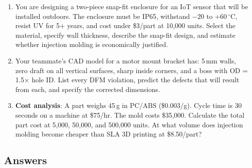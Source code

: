\documentclass[11pt,letterpaper,twoside,openany]{book}
\newcommand{\degC}{\ensuremath{{}^{\circ}\text{C}}}
\begin{document}
\begin{enumerate}[resume,leftmargin=1.5em]
  \item You are designing a two-piece snap-fit enclosure for an IoT sensor that will be installed outdoors. The enclosure must be IP65, withstand $-20$ to $+60$\,\degC, resist UV for 5+ years, and cost under \$3/part at 10,000 units. Select the material, specify wall thickness, describe the snap-fit design, and estimate whether injection molding is economically justified.

  \item Your teammate's CAD model for a motor mount bracket has: 5\,mm walls, zero draft on all vertical surfaces, sharp inside corners, and a boss with OD = 1.5$\times$ hole ID. List every DFM violation, predict the defects that will result from each, and specify the corrected dimensions.

  \item \textbf{Cost analysis}: A part weighs 45\,g in PC/ABS (\$0.003/g). Cycle time is 30\,seconds on a machine at \$75/hr. The mold costs \$35,000. Calculate the total part cost at 5,000, 50,000, and 500,000 units. At what volume does injection molding become cheaper than SLA 3D printing at \$8.50/part?
\end{enumerate}

\subsection{Answers}
\end{document}
